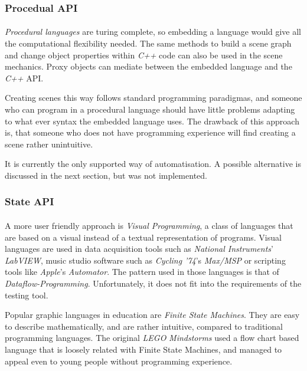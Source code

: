 \subsubsection{Procedual API}
 \paragraph{}
\textit{Procedural languages} are turing complete, so embedding a language would give all the computational flexibility needed. The same methods to build a scene graph and change object properties within \textit{C++} code can also be used in the scene mechanics. Proxy objects can mediate between the embedded language and the \textit{C++} API.

Creating scenes this way follows standard programming paradigmas, and someone who can program in a procedural language should have little problems adapting to what ever syntax the embedded language uses. The drawback of this approach is, that someone who does not have programming experience will find creating a scene rather unintuitive.

It is currently the only supported way of automatisation.
A possible alternative is discussed in the next section, but was not implemented.

\subsubsection{State API}
\paragraph{}
A more user friendly approach is \textit{Visual Programming}, a class of languages that are based on a visual instead of a textual representation of programs. Visual languages are used in data acquisition tools such as \textit{National Instruments}' \textit{LabVIEW}, music studio software such as \textit{Cycling '74}'s \textit{Max/MSP} or scripting tools like \textit{Apple}'s \textit{Automator}.
The pattern used in those languages is that of \textit{Dataflow-Programming}\cite{dataflow}. Unfortunately, it does not fit into the requirements of the testing tool.

Popular graphic languages in education are \textit{Finite State Machines}\cite{fsm}. They are easy to describe mathematically, and are rather intuitive, compared to traditional programming languages.
The original \textit{LEGO} \textit{Mindstorms} used a flow chart based language that is loosely related with Finite State Machines, and managed to appeal even to young people without programming experience.

